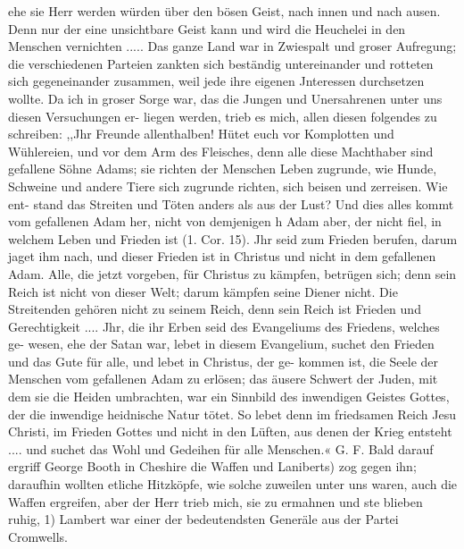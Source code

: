 ehe sie Herr werden würden über den bösen Geist, nach innen
und nach ausen. Denn nur der eine unsichtbare Geist kann und
wird die Heuchelei in den Menschen vernichten .....
Das ganze Land war in Zwiespalt und groser Aufregung;
die verschiedenen Parteien zankten sich beständig untereinander
und rotteten sich gegeneinander zusammen, weil jede ihre eigenen
Jnteressen durchsetzen wollte. Da ich in groser Sorge war, das
die Jungen und Unersahrenen unter uns diesen Versuchungen er-
liegen werden, trieb es mich, allen diesen folgendes zu schreiben:
,,Jhr Freunde allenthalben! Hütet euch vor Komplotten
und Wühlereien, und vor dem Arm des Fleisches, denn alle
diese Machthaber sind gefallene Söhne Adams; sie richten der
Menschen Leben zugrunde, wie Hunde, Schweine und andere
Tiere sich zugrunde richten, sich beisen und zerreisen. Wie ent-
stand das Streiten und Töten anders als aus der Lust? Und
dies alles kommt vom gefallenen Adam her, nicht von demjenigen h
Adam aber, der nicht fiel, in welchem Leben und Frieden ist
(1. Cor. 15). Jhr seid zum Frieden berufen, darum jaget ihm
nach, und dieser Frieden ist in Christus und nicht in dem gefallenen
Adam. Alle, die jetzt vorgeben, für Christus zu kämpfen, betrügen
sich; denn sein Reich ist nicht von dieser Welt; darum kämpfen
seine Diener nicht. Die Streitenden gehören nicht zu seinem
Reich, denn sein Reich ist Frieden und Gerechtigkeit .... Jhr,
die ihr Erben seid des Evangeliums des Friedens, welches ge-
wesen, ehe der Satan war, lebet in diesem Evangelium, suchet den
Frieden und das Gute für alle, und lebet in Christus, der ge-
kommen ist, die Seele der Menschen vom gefallenen Adam zu
erlösen; das äusere Schwert der Juden, mit dem sie die Heiden
umbrachten, war ein Sinnbild des inwendigen Geistes Gottes,
der die inwendige heidnische Natur tötet. So lebet denn im
friedsamen Reich Jesu Christi, im Frieden Gottes und nicht in
den Lüften, aus denen der Krieg entsteht .... und suchet das
Wohl und Gedeihen für alle Menschen.« G. F.
Bald darauf ergriff George Booth in Cheshire die Waffen
und Laniberts) zog gegen ihn; daraufhin wollten etliche Hitzköpfe,
wie solche zuweilen unter uns waren, auch die Waffen ergreifen,
aber der Herr trieb mich, sie zu ermahnen und ste blieben ruhig,
1) Lambert war einer der bedeutendsten Generäle aus der Partei Cromwells.


